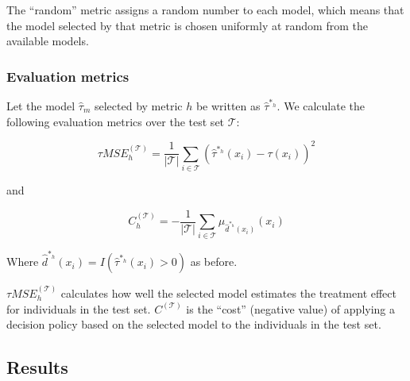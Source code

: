 The ``random'' metric assigns a random number to each model, which means that the model selected by that metric is chosen uniformly at random from the available models. 

\subsubsection{Evaluation metrics}

Let the model $\hat\tau_m$ selected by metric $h$ be written as $\hat\tau^{*_h}$. We calculate the following evaluation metrics over the test set $\mathcal T$:

\begin{equation}
\label{true-mse}
\tau MSE^{(\mathcal{T})}_h = \frac{1}{|\mathcal{T}|}\sum_{i \in \mathcal{T}} (\hat\tau^{*_h} (x_i) - \tau(x_i))^2
\end{equation}

and 

\begin{equation}
\label{true-value}
C^{(\mathcal{T})}_h = -\frac{1}{|\mathcal{T}|}\sum_{i \in \mathcal{T}} \mu_{\hat d^{*_h}(x_i)}(x_i)
\end{equation}

Where $\hat d^{*_h}(x_i) = I(\hat\tau^{*_h}(x_i) > 0)$ as before. 

$\tau MSE_{h}^{(\mathcal{T})}$ calculates how well the selected model estimates the treatment effect for individuals in the test set. $C^{(\mathcal{T})}$ is the ``cost'' (negative value) of applying a decision policy based on the selected model to the individuals in the test set. 

\subsection{Results}



